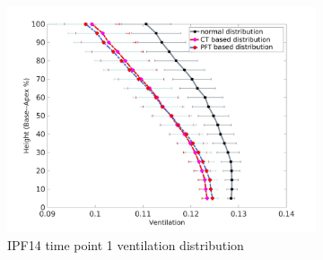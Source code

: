 \begin{figure}[htbp]  
\centering
\begin{subfigure}{.6\linewidth}%
  \includegraphics[width=\linewidth,trim={{.0\wd0} {.0\wd0} {.0\wd0} {.0\wd0}},clip]{Appendix/Image_AppexB/IPF1401/IPF1401_VentilationAgainstLungHeight.png} %
  \caption{IPF14 time point 1 ventilation distribution}
  \label{fig:IPF1401VQDistribution-a} 
\end{subfigure} 
\begin{subfigure}{.6\linewidth}%

\end{subfigure}
\end{figure}
